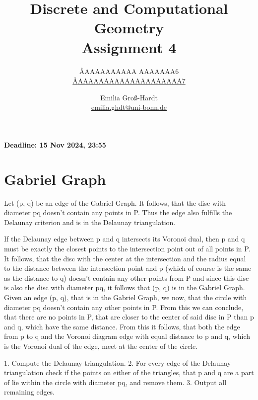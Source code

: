 \documentclass{article}
\title{Discrete and Computational Geometry \\ Assignment 4}
\author{
  \AA{AAAAAAAAAA AAAAAAA}{6} \\
  \href{mailto:\AA{AAAAAAAAAAAAAAAAAAAA}{7}}{\AA{AAAAAAAAAAAAAAAAAAAA}{7}}
  \and
  Emilia Groß-Hardt \\
  \href{mailto:emilia.ghdt@uni-bonn.de}{emilia.ghdt@uni-bonn.de}
}
\begin{document}
  \maketitle
  \begin{center}
    { \bfseries Deadline: 15 Nov 2024, 23:55 }
  \end{center}

  \section{Gabriel Graph}
  Let (p, q) be an edge of the Gabriel Graph. It follows, that the disc with diameter pq doesn't contain any points in P. Thus the edge also fulfills the Delaunay criterion and is in the Delaunay triangulation.


  If the Delaunay edge between p and q intersects its Voronoi dual, then p and q must be exactly the closest points to the intersection point out of all points in P. It follows, that the disc with the center at the intersection and the radius equal to the distance between the intersection point and p (which of course is the same as the distance to q) doesn't contain any other points from P and since this disc is also the disc with diameter pq, it follows that (p, q) is in the Gabriel Graph.
  Given an edge (p, q), that is in the Gabriel Graph, we now, that the circle with diameter pq doesn't contain any other points in P. From this we can conclude, that there are no points in P, that are closer to the center of said disc in P than p and q, which have the same distance. From this it follows, that both the edge from p to q and the Voronoi diagram edge with equal distance to p and q, which is the Voronoi dual of the edge, meet at the center of the circle.


  1. Compute the Delaunay triangulation.
  2. For every edge of the Delaunay triangulation check if the points on either of the triangles, that p and q are a part of lie within the circle with diameter pq, and remove them.
  3. Output all remaining edges.
  \section{}
  
  \section{}
\end{document}
